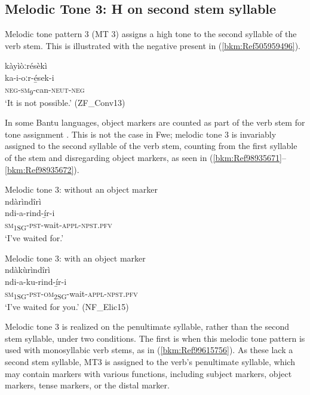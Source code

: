 \subsection{Melodic Tone 3: H on second stem syllable}
\label{bkm:Ref71540337}\hypertarget{Toc75352631}{}\label{bkm:Ref71540417}
Melodic tone pattern 3 (MT 3) assigns a high tone to the second syllable of the verb stem. This is illustrated with the negative present in (\ref{bkm:Ref505959496}).

\ea
\label{bkm:Ref505959496}
\glll kàyìòːrésèkì\\
ka-i-oːr-é̲sek-i\\
\textsc{neg}-\textsc{sm}\textsubscript{9}-can-\textsc{neut}-\textsc{neg}\\
\glt ‘It is not possible.’ (ZF\_Conv13)
\z

In some Bantu languages, object markers are counted as part of the verb stem for tone assignment \citep{Marlo2013}. This is not the case in Fwe; melodic tone 3 is invariably assigned to the second syllable of the verb stem, counting from the first syllable of the stem and disregarding object markers, as seen in (\ref{bkm:Ref98935671}--\ref{bkm:Ref98935672}).\largerpage[-1]

\ea
\label{bkm:Ref98935671}
Melodic tone 3: without an object marker\\
ndàrìndîrì\\
ndi-a-rind-í̲r-i\\
\textsc{sm}\textsubscript{1SG}-\textsc{pst}-wait-\textsc{appl}-\textsc{npst}.\textsc{pfv}\\
\glt ‘I’ve waited for.’
\z

\ea
\label{bkm:Ref98935672}
Melodic tone 3: with an object marker\\
ndàkùrìndîrì\\
ndi-a-ku-rind-í̲r-i\\
\textsc{sm}\textsubscript{1SG}-\textsc{pst}-\textsc{om}\textsubscript{2SG}-wait-\textsc{appl}-\textsc{npst}.\textsc{pfv}\\
\glt ‘I’ve waited for you.’ (NF\_Elic15)
\z

Melodic tone 3 is realized on the penultimate syllable, rather than the second stem syllable, under two conditions. The first is when this melodic tone pattern is used with monosyllabic verb stems, as in (\ref{bkm:Ref99615756}). As these lack a second stem syllable, MT3 is assigned to the verb’s penultimate syllable, which may contain markers with various functions, including subject markers, object markers, tense markers, or the distal marker.\pagebreak

